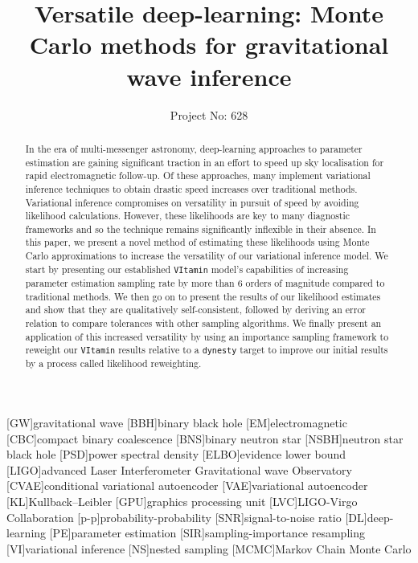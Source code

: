 \documentclass[a4paper]{jpconf}
\begin{document}
\title{Versatile deep-learning: Monte Carlo methods for gravitational wave inference}

\author{Project No: 628}

\address{\textit{SUPA, School of Physics and Astronomy\\University of Glasgow\\Glasgow G12 8QQ, United Kingdom}}


\begin{abstract}
In the era of multi-messenger astronomy, deep-learning approaches to parameter estimation are gaining significant traction in an effort to speed up sky localisation for rapid electromagnetic follow-up. Of these approaches, many implement variational inference techniques to obtain drastic speed increases over traditional methods. Variational inference compromises on versatility in pursuit of speed by avoiding likelihood calculations. However, these likelihoods are key to many diagnostic frameworks and so the technique remains significantly inflexible in their absence. In this paper, we present a novel method of estimating these likelihoods using Monte Carlo approximations to increase the versatility of our variational inference model. We start by presenting our established \texttt{VItamin} model’s capabilities of increasing parameter estimation sampling rate by more than 6 orders of magnitude compared to traditional methods. We then go on to present the results of our likelihood estimates and show that they are qualitatively self-consistent, followed by deriving an error relation to compare tolerances with other sampling algorithms. We finally present an application of this increased versatility by using an importance sampling framework to reweight our \texttt{VItamin} results relative to a \texttt{dynesty} target to improve our initial results by a process called likelihood reweighting. 
\end{abstract}

[GW]{gravitational wave}
[BBH]{binary black hole}
[EM]{electromagnetic}
[CBC]{compact binary coalescence}
[BNS]{binary neutron star}
[NSBH]{neutron star black hole}
[PSD]{power spectral density}
[ELBO]{evidence lower bound}
[LIGO]{advanced Laser Interferometer Gravitational wave Observatory}
[CVAE]{conditional variational autoencoder}
[VAE]{variational autoencoder}
[KL]{Kullback--Leibler}
[GPU]{graphics processing unit}
[LVC]{LIGO-Virgo Collaboration}
[p-p]{probability-probability}
[SNR]{signal-to-noise ratio}
[DL]{deep-learning}
[PE]{parameter estimation}
[SIR]{sampling-importance resampling}
[VI]{variational inference}
[NS]{nested sampling}
[MCMC]{Markov Chain Monte Carlo}
\end{document}
